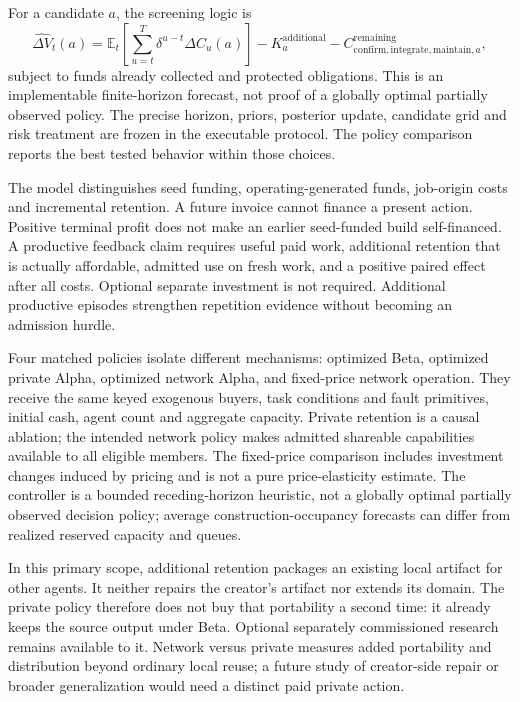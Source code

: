 \documentclass[11pt,letterpaper]{article}
\begin{document}
For a candidate $a$, the screening logic is
\begin{equation}
\widehat{\Delta V}_t(a)=\mathbb E_t\!\left[\sum_{u=t}^{T}\delta^{u-t}\Delta C_u(a)\right]-K^{\mathrm{additional}}_a-C^{\mathrm{remaining}}_{\mathrm{confirm,integrate,maintain},a},
\end{equation}
subject to funds already collected and protected obligations. This is an implementable finite-horizon forecast, not proof of a globally optimal partially observed policy. The precise horizon, priors, posterior update, candidate grid and risk treatment are frozen in the executable protocol. The policy comparison reports the best tested behavior within those choices.

The model distinguishes seed funding, operating-generated funds, job-origin costs and incremental retention. A future invoice cannot finance a present action. Positive terminal profit does not make an earlier seed-funded build self-financed. A productive feedback claim requires useful paid work, additional retention that is actually affordable, admitted use on fresh work, and a positive paired effect after all costs. Optional separate investment is not required. Additional productive episodes strengthen repetition evidence without becoming an admission hurdle.

Four matched policies isolate different mechanisms: optimized Beta, optimized private Alpha, optimized network Alpha, and fixed-price network operation. They receive the same keyed exogenous buyers, task conditions and fault primitives, initial cash, agent count and aggregate capacity. Private retention is a causal ablation; the intended network policy makes admitted shareable capabilities available to all eligible members. The fixed-price comparison includes investment changes induced by pricing and is not a pure price-elasticity estimate. The controller is a bounded receding-horizon heuristic, not a globally optimal partially observed decision policy; average construction-occupancy forecasts can differ from realized reserved capacity and queues.

In this primary scope, additional retention packages an existing local artifact for other agents. It neither repairs the creator's artifact nor extends its domain. The private policy therefore does not buy that portability a second time: it already keeps the source output under Beta. Optional separately commissioned research remains available to it. Network versus private measures added portability and distribution beyond ordinary local reuse; a future study of creator-side repair or broader generalization would need a distinct paid private action.
\end{document}
